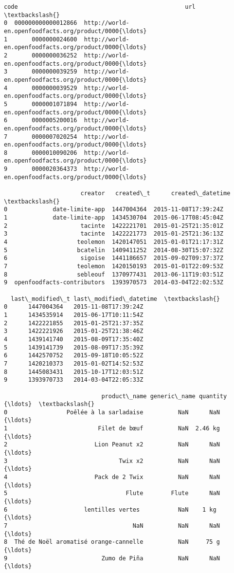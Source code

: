 \documentclass[11pt]{article}
\makeatletter
\newcommand{\boxspacing}{\kern\kvtcb@left@rule\kern\kvtcb@boxsep}
\newcommand{\prompt}[4]{
        \ttfamily\llap{{\color{#2}[#3]:\hspace{3pt}#4}}\vspace{-\baselineskip}
    }
\makeatother
\begin{document}
            \begin{tcolorbox}[breakable, size=fbox, boxrule=.5pt, pad at break*=1mm, opacityfill=0]
\prompt{Out}{outcolor}{5}{\boxspacing}
\begin{Verbatim}[commandchars=\\\{\}]
                 code                                                url  \textbackslash{}
0  000000000000012866  http://world-en.openfoodfacts.org/product/0000{\ldots}
1       0000000024600  http://world-en.openfoodfacts.org/product/0000{\ldots}
2       0000000036252  http://world-en.openfoodfacts.org/product/0000{\ldots}
3       0000000039259  http://world-en.openfoodfacts.org/product/0000{\ldots}
4       0000000039529  http://world-en.openfoodfacts.org/product/0000{\ldots}
5       0000001071894  http://world-en.openfoodfacts.org/product/0000{\ldots}
6       0000005200016  http://world-en.openfoodfacts.org/product/0000{\ldots}
7       0000007020254  http://world-en.openfoodfacts.org/product/0000{\ldots}
8       0000010090206  http://world-en.openfoodfacts.org/product/0000{\ldots}
9       0000020364373  http://world-en.openfoodfacts.org/product/0000{\ldots}

                      creator   created\_t      created\_datetime  \textbackslash{}
0             date-limite-app  1447004364  2015-11-08T17:39:24Z
1             date-limite-app  1434530704  2015-06-17T08:45:04Z
2                     tacinte  1422221701  2015-01-25T21:35:01Z
3                     tacinte  1422221773  2015-01-25T21:36:13Z
4                    teolemon  1420147051  2015-01-01T21:17:31Z
5                    bcatelin  1409411252  2014-08-30T15:07:32Z
6                     sigoise  1441186657  2015-09-02T09:37:37Z
7                    teolemon  1420150193  2015-01-01T22:09:53Z
8                    sebleouf  1370977431  2013-06-11T19:03:51Z
9  openfoodfacts-contributors  1393970573  2014-03-04T22:02:53Z

  last\_modified\_t last\_modified\_datetime  \textbackslash{}
0      1447004364   2015-11-08T17:39:24Z
1      1434535914   2015-06-17T10:11:54Z
2      1422221855   2015-01-25T21:37:35Z
3      1422221926   2015-01-25T21:38:46Z
4      1439141740   2015-08-09T17:35:40Z
5      1439141739   2015-08-09T17:35:39Z
6      1442570752   2015-09-18T10:05:52Z
7      1420210373   2015-01-02T14:52:53Z
8      1445083431   2015-10-17T12:03:51Z
9      1393970733   2014-03-04T22:05:33Z

                            product\_name generic\_name quantity  {\ldots}  \textbackslash{}
0                 Poêlée à la sarladaise          NaN      NaN  {\ldots}
1                          Filet de bœuf          NaN  2.46 kg  {\ldots}
2                         Lion Peanut x2          NaN      NaN  {\ldots}
3                                Twix x2          NaN      NaN  {\ldots}
4                         Pack de 2 Twix          NaN      NaN  {\ldots}
5                                  Flute        Flute      NaN  {\ldots}
6                      lentilles vertes           NaN    1 kg   {\ldots}
7                                    NaN          NaN      NaN  {\ldots}
8  Thé de Noël aromatisé orange-cannelle          NaN     75 g  {\ldots}
9                           Zumo de Piña          NaN      NaN  {\ldots}


\end{Verbatim}
\end{tcolorbox}
\end{document}
